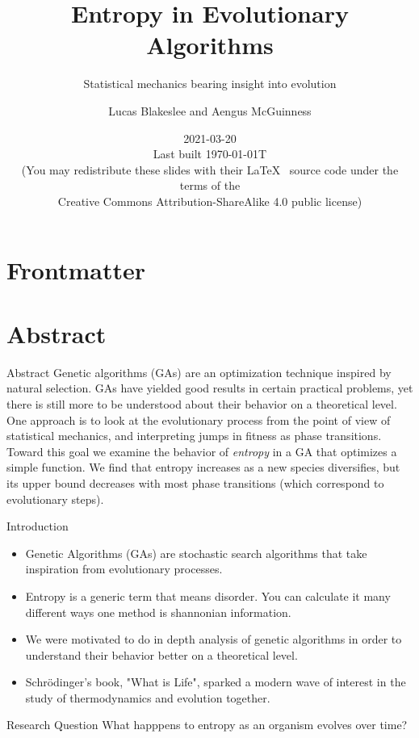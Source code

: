 \documentclass[10pt,aspectratio=169]{beamer}
\title{Entropy in Evolutionary Algorithms}
\subtitle{Statistical mechanics bearing insight into evolution}
\author{Lucas Blakeslee and Aengus McGuinness}
\institute[SF High]{
  Santa Fe High School \\
  Institute for Computing in Research}
\date{2021-03-20 \\
  {\smaller[2] Last built \today{}T\currenttime } \\
  \smallskip
      {\smaller[4] (You may redistribute these slides with their \LaTeX\
        \vspace{-0.1cm}
        source code under the terms of the \\
        Creative Commons Attribution-ShareAlike 4.0 public license)}
}
\begin{document}
\section*{Frontmatter}

\begin{frame}
  \maketitle
\end{frame}

\section{Abstract}

\begin{frame}{Abstract}
	Genetic algorithms (GAs) are an optimization technique inspired by
	natural selection. GAs have yielded good results in certain practical
	problems, yet there is still more to be understood about their
	behavior on a theoretical level. One approach is to look at the
	evolutionary process from the point of view of statistical mechanics,
	and interpreting jumps in fitness as phase transitions. Toward this
	goal we examine the behavior of \emph{entropy} in a GA that optimizes
	a simple function.  We find that entropy increases as a new species
	diversifies, but its upper bound decreases with most phase
	transitions (which correspond to evolutionary steps).
\end{frame}

\begin{frame}{Introduction}
	\begin{itemize}
		\item Genetic Algorithms (GAs) are stochastic search algorithms that take inspiration from evolutionary processes. 
		\item Entropy is a generic term that means disorder. You can calculate it many different ways one method is shannonian information.
		\item We were motivated to do in depth analysis of genetic algorithms in order to understand their behavior better on a theoretical level.
		\item Schrödinger's book, "What is Life", sparked a modern wave of interest in the study of thermodynamics and evolution together.
	\end{itemize}
\end{frame}

\begin{frame}{Research Question}
		What happpens to entropy as an organism evolves over time? 
\end{frame}
\end{document}
